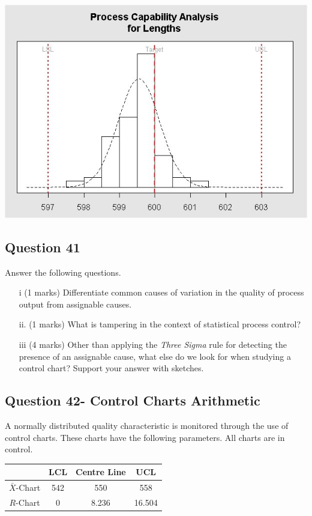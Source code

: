 \documentclass[a4paper,12pt]{article}
\begin{document}
	\begin{center}
		\includegraphics[scale=0.55]{images/ExamQ4hist}
	\end{center}
	\newpage

\subsection*{Question 41}
Answer the following questions.

\begin{itemize}
	\item[i] (1 marks) Differentiate common causes of variation in the quality of process output from assignable causes.
	\item[ii.] (1 marks) What is tampering in the context of statistical process control?
	\item[iii] (4 marks) Other than applying the \emph{Three Sigma} rule for detecting the presence of an assignable cause, what else do we look for when studying a control chart? Support your answer with sketches.
\end{itemize}

\subsection*{Question 42- Control Charts Arithmetic}

A normally distributed quality characteristic is monitored through the use of control charts. These charts have the following parameters. All charts are in control.
\begin{center}
	\begin{tabular}{|c|c|c|c|}
		\hline  & LCL & Centre Line & UCL \\
		\hline $\bar{X}$-Chart & 542 & 550 & 558 \\
		\hline $R$-Chart & 0 & 8.236 & 16.504 \\ \hline
	\end{tabular}
\end{center}
\end{document}
